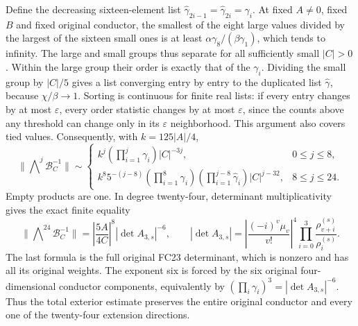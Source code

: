 Define the decreasing sixteen-element list
$\widehat\gamma_{2i-1}=\widehat\gamma_{2i}=\gamma_i$.
At fixed $A\ne0$, fixed $B$ and fixed original conductor, the smallest
of the eight large values divided by the largest of the sixteen small
ones is at least $\alpha\gamma_8/(\beta\gamma_1)$, which tends to
infinity. The large and small groups thus separate for all sufficiently
small $|C|>0$. Within the large group their order is exactly that of
the $\gamma_i$. Dividing the small group by $|C|/5$ gives a list
converging entry by entry to the duplicated list $\widehat\gamma$,
because $\chi/\beta\to1$. Sorting is continuous for finite real lists:
if every entry changes by at most $\varepsilon$, every order statistic
changes by at most $\varepsilon$, since the counts above any threshold
can change only in its $\varepsilon$ neighborhood. This argument also
covers tied values. Consequently, with $k=125|A|/4$,
\[
 \|\mathop{\bigwedge}\nolimits^j\mathcal B_C^{-1}\|
 \sim\begin{cases}
 k^j(\prod_{i=1}^{j}\gamma_i)|C|^{-3j},&0\le j\le8,\\
 k^8 5^{-(j-8)}(\prod_{i=1}^{8}\gamma_i)
      (\prod_{i=1}^{j-8}\widehat\gamma_i)|C|^{j-32},&8\le j\le24.
 \end{cases}                                                \tag{ETR27}
\]
Empty products are one. In degree twenty-four, determinant
multiplicativity gives the exact finite equality
\[
 \|\mathop{\bigwedge}\nolimits^{24}\mathcal B_C^{-1}\|
   =\left|\frac{5A}{4C}\right|^8 |\det A_{3,s}|^{-6},\qquad
 |\det A_{3,s}|=
 \left|\frac{(-i)^v\mu_v}{v!}\right|^4
       \prod_{i=0}^{3}\frac{\rho_{v+i}^{(s)}}{\rho_i^{(s)}}.
                                                               \tag{ETR28}
\]
The last formula is the full original FC23 determinant, which is
nonzero and has all its original weights. The exponent six is forced
by the six original four-dimensional conductor components, equivalently
by $(\prod_i\gamma_i)^3=|\det A_{3,s}|^{-6}$. Thus the total exterior
estimate preserves the entire original conductor and every one of the
twenty-four extension directions.

